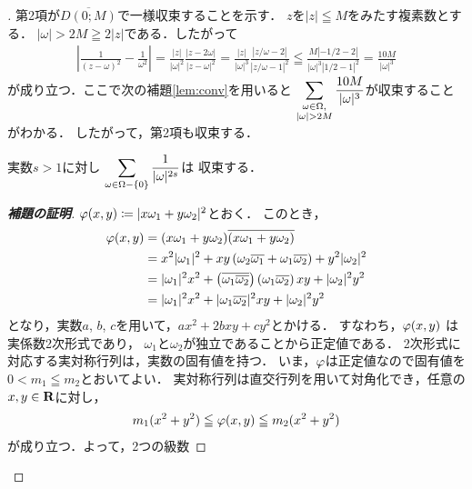 \begin{proof}[\pfb]
    第2項が$\overline{D(0;M)}$で一様収束することを示す．
    $z$を$|z|\leqq M$をみたす複素数とする．
    $|\omega|>2M\geqq2|z|$である．したがって
    \begin{align*}
        \left|\frac{1}{(z-\omega)^2}-\frac{1}{\omega^2}\right|
        =\frac{|z|}{|\omega|^2}\frac{|z-2\omega|}{|z-\omega|^2}
        =\frac{|z|}{|\omega|^3}\frac{|z/\omega-2|}{|z/\omega-1|^2}
        \leqq\frac{M|-1/2-2|}{|\omega|^3|1/2-1|^2}
        =\frac{10M}{|\omega|^3}    
    \end{align*}
    が成り立つ．ここで次の補題\ref{lem:conv}を用いると
    $\dip \sum_{\substack{\omega\in\Omega,\\|\omega|>2M}}
    \frac{10M}{|\omega|^{3}}$が収束することがわかる．
    したがって，第2項も収束する．
    \begin{Lemma}\label{lem:conv}
        実数$s>1$に対し
        $\displaystyle \sum_{\omega\in\Omega-\{0\}}\frac{1}{|\omega|^{2s}}$は
        収束する．
    \end{Lemma}
    \begin{proof}[\textbf{補題の証明}]
        $\varphi(x,y)\coloneqq |x\omega_1+y\omega_2|^2$とおく．
        このとき，
        \begin{align*}
            \varphi(x,y)
            &=(x\omega_1+y\omega_2)\overline{(x\omega_1+y\omega_2)}\\
            &=x^2|\omega_1|^2+xy\left(
                \omega_2\overline{\omega_1}+\omega_1\overline{\omega_2}
                \right)+y^2|\omega_2|^2\\
            &=|\omega_1|^2x^2+\left(
                \overline{\omega_1\overline{\omega_2}}
                \right)\left(\omega_1\overline{\omega_2}
                \right)xy+|\omega_2|^2y^2\\
            &=|\omega_1|^2x^2+|\omega_1\overline{\omega_2}|^2xy+|\omega_2|^2y^2
        \end{align*}
        となり，実数$a$, $b$, $c$を用いて，$ax^2+2bxy+cy^2$とかける．
        すなわち，$\varphi(x,y)$ は実係数2次形式であり，
        $\omega_1$と$\omega_2$が独立であることから正定値である．
        2次形式に対応する実対称行列は，実数の固有値を持つ．
        いま，$\varphi$は正定値なので固有値を$0< m_1\leqq m_2$とおいてよい．
        実対称行列は直交行列を用いて対角化でき，任意の$x,y\in\mathbf{R}$に対し，
        \begin{align*}
            m_1(x^2+y^2)\leqq\varphi(x,y)\leqq m_2(x^2+y^2)
        \end{align*}
        が成り立つ．よって，2つの級数

\end{proof}
\end{proof}
